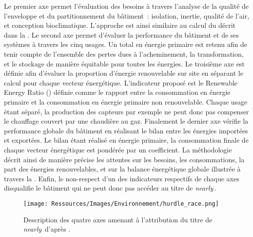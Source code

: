 Le premier axe permet l’évaluation des besoins à travers l’analyse
de la qualité de l’enveloppe et du partitionnement du bâtiment~: isolation, inertie, qualité de l’air,
et conception bioclimatique. L’approche est ainsi similaire au calcul du  décrit dans
la .
Le second axe permet d’évaluer la performance du bâtiment et de ses systèmes à travers les
cinq usages. Un total en énergie primaire est retenu afin de tenir compte de l’ensemble
des pertes dues à l’acheminement, la transformation, et le stockage de manière équitable
pour toutes les énergies.
Le troisième axe est définie afin d’évaluer la proportion d’énergie renouvelable sur site en séparant
le calcul pour chaque vecteur énergétique. L’indicateur proposé est le Renewable Energy Ratio
() définie comme le rapport entre la consommation en énergie primaire et la consommation
en énergie primaire non renouvelable. Chaque usage étant séparé, la production des
capteurs  par exemple ne peut donc pas compenser le chauffage couvert par une chaudière
au gaz.
Finalement le dernier axe vérifie la performance globale du bâtiment en réalisant
le bilan entre les énergies importées et exportées. Le bilan étant réalisé en énergie
primaire, la consommation finale de chaque vecteur énergétique est pondérée par un
coefficient.
La méthodologie décrit ainsi de manière précise les attentes sur les besoins, les
consommations, la part des énergies renouvelables, et sur la balance énergétique globale
illustrée à travers la .
Enfin, le non-respect d’un des indicateurs respectifs de chaque axes disqualifie le bâtiment
qui ne peut donc pas accéder au titre de \textit{nearly}\,.

\begin{figure}
    \centering
    \texttt{[image: Ressources/Images/Environnement/hurdle\_race.png]}
    \caption{Description des quatre axes amenant à l’attribution du titre de
             \textit{nearly}\, d’après \textcite{Zirngibl2014}.}
    \label{fig:attribution_nZEB}
\end{figure}



